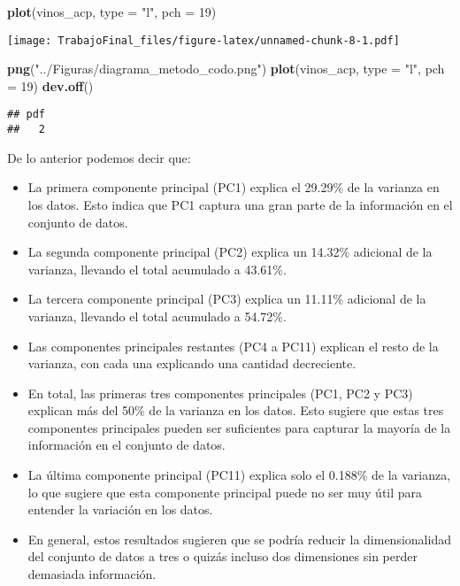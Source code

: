 \documentclass[
]{article}
\newenvironment{Shaded}{\begin{snugshade}}{\end{snugshade}}
\newcommand{\AttributeTok}[1]{\textcolor[rgb]{0.13,0.29,0.53}{#1}}
\newcommand{\DecValTok}[1]{\textcolor[rgb]{0.00,0.00,0.81}{#1}}
\newcommand{\FunctionTok}[1]{\textcolor[rgb]{0.13,0.29,0.53}{\textbf{#1}}}
\newcommand{\NormalTok}[1]{#1}
\newcommand{\StringTok}[1]{\textcolor[rgb]{0.31,0.60,0.02}{#1}}
\providecommand{\tightlist}{%
  \setlength{\itemsep}{0pt}\setlength{\parskip}{0pt}}
\begin{document}
\begin{Shaded}
\begin{Highlighting}[]
\FunctionTok{plot}\NormalTok{(vinos\_acp, }\AttributeTok{type =} \StringTok{"l"}\NormalTok{, }\AttributeTok{pch =} \DecValTok{19}\NormalTok{)}
\end{Highlighting}
\end{Shaded}

\texttt{[image: TrabajoFinal\_files/figure-latex/unnamed-chunk-8-1.pdf]}

\begin{Shaded}
\begin{Highlighting}[]
\FunctionTok{png}\NormalTok{(}\StringTok{"../Figuras/diagrama\_metodo\_codo.png"}\NormalTok{)}
\FunctionTok{plot}\NormalTok{(vinos\_acp, }\AttributeTok{type =} \StringTok{"l"}\NormalTok{, }\AttributeTok{pch =} \DecValTok{19}\NormalTok{)}
\FunctionTok{dev.off}\NormalTok{()}
\end{Highlighting}
\end{Shaded}

\begin{verbatim}
## pdf 
##   2
\end{verbatim}

De lo anterior podemos decir que:

\begin{itemize}
\tightlist
\item
  La primera componente principal (PC1) explica el 29.29\% de la
  varianza en los datos. Esto indica que PC1 captura una gran parte de
  la información en el conjunto de datos.
\item
  La segunda componente principal (PC2) explica un 14.32\% adicional de
  la varianza, llevando el total acumulado a 43.61\%.
\item
  La tercera componente principal (PC3) explica un 11.11\% adicional de
  la varianza, llevando el total acumulado a 54.72\%.
\item
  Las componentes principales restantes (PC4 a PC11) explican el resto
  de la varianza, con cada una explicando una cantidad decreciente.
\item
  En total, las primeras tres componentes principales (PC1, PC2 y PC3)
  explican más del 50\% de la varianza en los datos. Esto sugiere que
  estas tres componentes principales pueden ser suficientes para
  capturar la mayoría de la información en el conjunto de datos.
\item
  La última componente principal (PC11) explica solo el 0.188\% de la
  varianza, lo que sugiere que esta componente principal puede no ser
  muy útil para entender la variación en los datos.
\item
  En general, estos resultados sugieren que se podría reducir la
  dimensionalidad del conjunto de datos a tres o quizás incluso dos
  dimensiones sin perder demasiada información.
\end{itemize}
\end{document}
